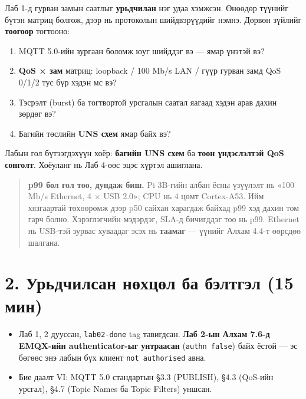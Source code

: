 Лаб 1-д гурван замын саатлыг \textbf{урьдчилан} нэг удаа хэмжсэн. Өнөөдөр түүнийг бүтэн матриц болгож, дээр нь протоколын шийдвэрүүдийг нэмнэ. Дөрвөн зүйлийг \textbf{тоогоор} тогтооно:

\begin{enumerate}
\def\labelenumi{\arabic{enumi}.}
\tightlist
\item
  MQTT 5.0-ийн зургаан боломж юуг шийддэг вэ --- ямар үнэтэй вэ?
\item
  \textbf{QoS × зам} матриц: loopback / 100 Mb/s LAN / гүүр гурван замд QoS 0/1/2 тус бүр хэдэн мс вэ?
\item
  Тэсрэлт (burst) ба тогтвортой урсгалын саатал яагаад хэдэн арав дахин зөрдөг вэ?
\item
  Багийн төслийн \textbf{UNS схем} ямар байх вэ?
\end{enumerate}

Лабын гол бүтээгдэхүүн хоёр: \textbf{багийн UNS схем} ба \textbf{тоон үндэслэлтэй QoS сонголт}. Хоёуланг нь Лаб 4-өөс эцэс хүртэл ашиглана.

\begin{quote}
\textbf{p99 бол гол тоо, дундаж биш.} Pi 3B-гийн албан ёсны үзүүлэлт нь «100 Mb/s Ethernet, 4 × USB 2.0»; CPU нь 4 цөмт Cortex-A53. Ийм хязгаартай төхөөрөмж дээр p50 сайхан харагдаж байхад p99 хэд дахин том гарч болно. Хэрэглэгчийн мэдэрдэг, SLA-д бичигддэг тоо нь p99. Ethernet нь USB-тэй зурвас хуваадаг эсэх нь \textbf{таамаг} --- үүнийг Алхам 4.4-т өөрсдөө шалгана.
\end{quote}

\hypertarget{ux443ux440ux44cux434ux447ux438ux43bux441ux430ux43d-ux43dux4e9ux445ux446ux4e9ux43b-ux431ux430-ux431ux44dux43bux442ux433ux44dux43b-15-ux43cux438ux43d}{%
\section{2. Урьдчилсан нөхцөл ба бэлтгэл (15 мин)}\label{ux443ux440ux44cux434ux447ux438ux43bux441ux430ux43d-ux43dux4e9ux445ux446ux4e9ux43b-ux431ux430-ux431ux44dux43bux442ux433ux44dux43b-15-ux43cux438ux43d}}

\begin{itemize}
\tightlist
\item
  Лаб 1, 2 дууссан, \texttt{lab02-done} tag тавигдсан. \textbf{Лаб 2-ын Алхам 7.6-д EMQX-ийн authenticator-ыг унтраасан} (\texttt{authn\ false}) байх ёстой --- эс бөгөөс энэ лабын бүх клиент \texttt{not\ authorised} авна.
\item
  Бие даалт VI: MQTT 5.0 стандартын §3.3 (PUBLISH), §4.3 (QoS-ийн урсгал), §4.7 (Topic Names ба Topic Filters) уншсан.
\end{itemize}


